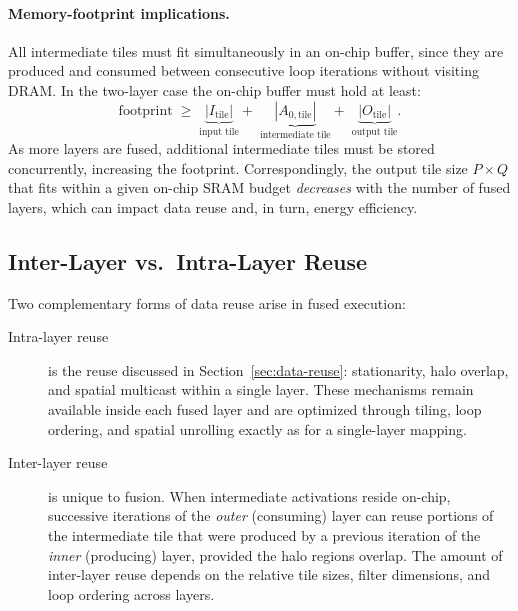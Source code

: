 \paragraph{Memory-footprint implications.}
All intermediate tiles must fit simultaneously in an on-chip buffer,
since they are produced and consumed between consecutive loop
iterations without visiting DRAM.
In the two-layer case the on-chip buffer must hold at least:
\begin{equation}
\label{eq:fused-footprint}
\text{footprint}
  \;\geq\;
  \underbrace{|I_{\text{tile}}|}_{\text{input tile}}
  +\;
  \underbrace{|A_{0,\text{tile}}|}_{\text{intermediate tile}}
  +\;
  \underbrace{|O_{\text{tile}}|}_{\text{output tile}}.
\end{equation}
As more layers are fused, additional intermediate tiles must be stored
concurrently, increasing the footprint.  Correspondingly, the output
tile size $P\!\times\!Q$ that fits within a given on-chip SRAM budget
\emph{decreases} with the number of fused layers, which can impact
data reuse and, in turn, energy efficiency.

\subsection{Inter-Layer vs.\ Intra-Layer Reuse}
\label{sec:inter-intra-reuse}

Two complementary forms of data reuse arise in fused execution:

\begin{description}
  \item[Intra-layer reuse]
    is the reuse discussed in Section~\ref{sec:data-reuse}:
    stationarity, halo overlap, and spatial multicast within a single
    layer.  These mechanisms remain available inside each fused layer and
    are optimized through tiling, loop ordering, and spatial unrolling
    exactly as for a single-layer mapping.

  \item[Inter-layer reuse]
    is unique to fusion.
    When intermediate activations reside on-chip, successive iterations
    of the \emph{outer} (consuming) layer can reuse portions of the
    intermediate tile that were produced by a previous iteration of the
    \emph{inner} (producing) layer, provided the halo regions overlap.
    The amount of inter-layer reuse depends on the relative tile sizes,
    filter dimensions, and loop ordering across layers.
\end{description}


